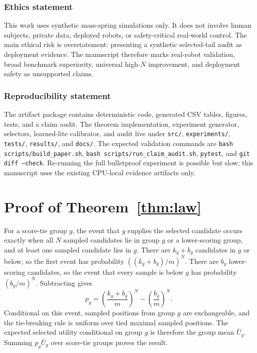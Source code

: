 \documentclass{article}
\newcommand{\utility}{U}
\begin{document}
\subsubsection*{Ethics statement}
This work uses synthetic mass-spring simulations only.  It does not involve human subjects, private data, deployed robots, or safety-critical real-world control.  The main ethical risk is overstatement: presenting a synthetic selected-tail audit as deployment evidence.  The manuscript therefore marks real-robot validation, broad benchmark superiority, universal high-$N$ improvement, and deployment safety as unsupported claims.

\subsubsection*{Reproducibility statement}
The artifact package contains deterministic code, generated CSV tables, figures, tests, and a claim audit.  The theorem implementation, experiment generator, selectors, learned-lite calibrator, and audit live under \texttt{src/}, \texttt{experiments/}, \texttt{tests/}, \texttt{results/}, and \texttt{docs/}.  The expected validation commands are \texttt{bash scripts/build\_paper.sh}, \texttt{bash scripts/run\_claim\_audit.sh}, \texttt{pytest}, and \texttt{git diff --check}.  Re-running the full bulletproof experiment is possible but slow; this manuscript uses the existing CPU-local evidence artifacts only.




\appendix

\section{Proof of Theorem~\ref{thm:law}}

For a score-tie group $g$, the event that $g$ supplies the selected candidate occurs exactly when all $N$ sampled candidates lie in group $g$ or a lower-scoring group, and at least one sampled candidate lies in $g$.  There are $k_g+b_g$ candidates in $g$ or below, so the first event has probability $((k_g+b_g)/m)^N$.  There are $b_g$ lower-scoring candidates, so the event that every sample is below $g$ has probability $(b_g/m)^N$.  Subtracting gives
\[
p_g = \left(\frac{k_g+b_g}{m}\right)^N - \left(\frac{b_g}{m}\right)^N .
\]
Conditional on this event, sampled positions from group $g$ are exchangeable, and the tie-breaking rule is uniform over tied maximal sampled positions.  The expected selected utility conditional on group $g$ is therefore the group mean $\bar{\utility}_g$.  Summing $p_g\bar{\utility}_g$ over score-tie groups proves the result.
\end{document}
